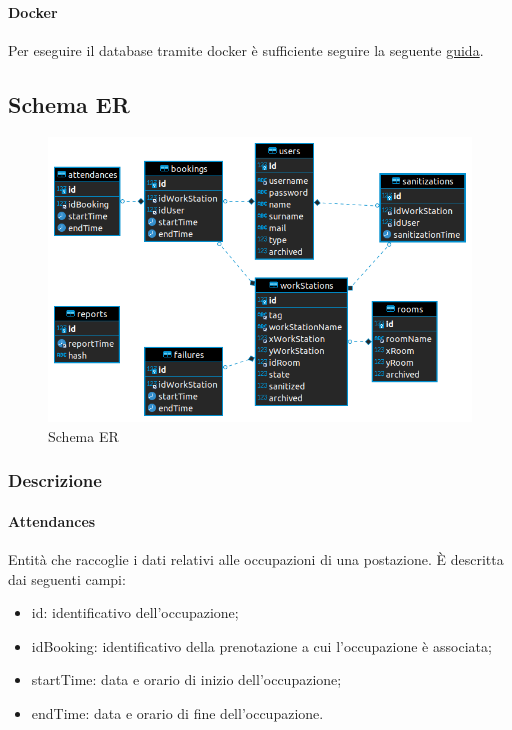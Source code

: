 \paragraph{Docker}
Per eseguire il database tramite docker è sufficiente seguire la seguente \href{https://hub.docker.com/\_/mariadb}{guida}.

\subsection{Schema ER}
\begin{figure}[H]
	\centering
	\includegraphics[width=16cm]{res/images/schemaER.png}
	\caption{Schema ER}
	\label{fig:schema ER}
\end{figure}

\subsubsection{Descrizione}
\paragraph{Attendances}
Entità che raccoglie i dati relativi alle occupazioni di una postazione. È descritta dai seguenti campi:
\begin{itemize}
	\item id: identificativo dell'occupazione;
	\item idBooking: identificativo della prenotazione a cui l'occupazione è associata;
	\item startTime: data e orario di inizio dell'occupazione;
	\item endTime: data e orario di fine dell'occupazione.
\end{itemize}

